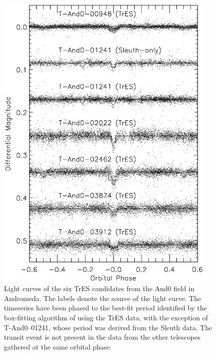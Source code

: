 \begin{figure}
\begin{center}
\includegraphics[width=0.95\textwidth]{2_f3}
\caption[TrES light curves of the six candidates from the And0 field]{Light curves of the six TrES candidates from the And0 field in Andromeda. The labels denote the source of the light curve. The timeseries have been phased to the best-fit period identified by the box-fitting algorithm of \citet{Kovacs_Zucker_Mazeh:aa:2002a} using the TrES data, with the exception of \mbox{T-And0--01241}, whose period was derived from the Sleuth data. The transit event is not present in the data from the other telescopes gathered at the same orbital phase.}\label{cha:and0:fig:tresCand}
\end{center}
\end{figure}


